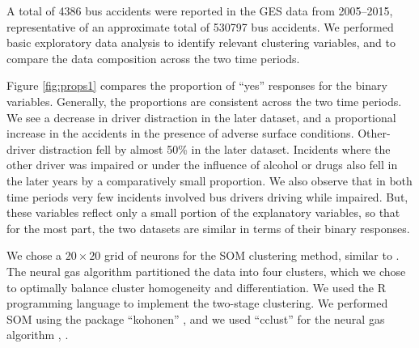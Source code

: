 A total of 4386 bus accidents were reported in the GES data from 2005--2015, representative of an approximate total of 530797 bus accidents. We performed basic exploratory data analysis to identify relevant clustering variables, and to compare the data composition across the two time periods.

Figure \ref{fig:props1} compares the proportion of ``yes'' responses for the binary variables. Generally, the proportions are consistent across the two time periods. We see a decrease in driver distraction in the later dataset, and a proportional increase in the accidents in the presence of adverse surface conditions. Other-driver distraction fell by almost 50\% in the later dataset. Incidents where the other driver was impaired or under the influence of alcohol or drugs also fell in the later years by a comparatively small proportion. We also observe that in both time periods very few incidents involved bus drivers driving while impaired. But, these variables reflect only a small portion of the explanatory variables, so that for the most part, the two datasets are similar in terms of their binary responses.
%

We chose a $20\times 20$ grid of neurons for the SOM clustering method, similar to \citet{prato2013bus}. The neural gas algorithm partitioned the data into four clusters, which we chose to optimally balance cluster homogeneity and differentiation. We used the R programming language \citep{r:r} to implement the two-stage clustering. We performed SOM using the package ``kohonen'' \citep{r:kohonen}, \citep{r:r} and we used ``cclust'' for the neural gas algorithm \citep{r:cclust}, \citep{r:r}.

